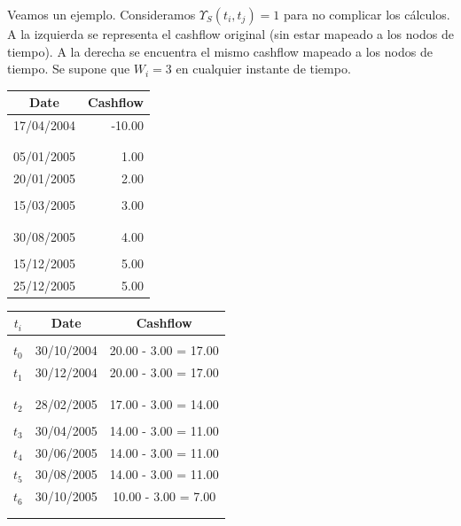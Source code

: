 Veamos un ejemplo. Consideramos $\Upsilon_S(t_i,t_j)=1$ para no complicar los c\'alculos.
A la izquierda se representa el cashflow original (sin estar mapeado a los nodos de
tiempo). A la derecha se encuentra el mismo cashflow mapeado a los nodos de tiempo.
Se supone que $W_i=3$ en cualquier instante de tiempo.
\newline
\newline
\begin{minipage}[c]{0.4\columnwidth}%
\centering
\begin{tabular}{c|r}
\textbf{Date} & \textbf{Cashflow} \\
\hline
17/04/2004 & -10.00 \\
           &        \\
           &        \\
05/01/2005 &   1.00 \\
20/01/2005 &   2.00 \\
           &        \\
15/03/2005 &   3.00 \\
           &        \\
           &        \\
30/08/2005 &   4.00 \\
           &        \\
15/12/2005 &   5.00 \\
25/12/2005 &   5.00 \\
\end{tabular}
\end{minipage}%
\begin{minipage}[c]{0.6\columnwidth}%
\centering
\begin{tabular}{c|c|c}
\textbf{$t_i$} & \textbf{Date}  & \textbf{Cashflow} \\
\hline
      &            &           \\
$t_0$ & 30/10/2004 & 20.00 - 3.00 = 17.00 \\
$t_1$ & 30/12/2004 & 20.00 - 3.00 = 17.00 \\
      &            &       \\
      &            &       \\
$t_2$ & 28/02/2005 & 17.00 - 3.00 = 14.00 \\
      &            &       \\
$t_3$ & 30/04/2005 & 14.00 - 3.00 = 11.00 \\
$t_4$ & 30/06/2005 & 14.00 - 3.00 = 11.00 \\
$t_5$ & 30/08/2005 & 14.00 - 3.00 = 11.00 \\
$t_6$ & 30/10/2005 & 10.00 - 3.00 = 7.00 \\
      &            &       \\
      &            &       \\
\end{tabular}
\end{minipage}%

